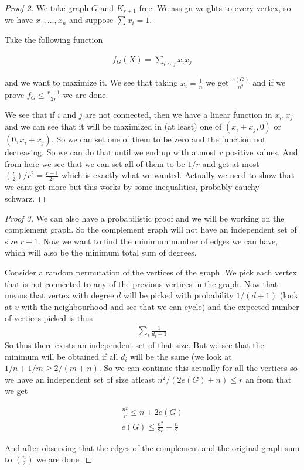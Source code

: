 \begin{proof}[Proof 2]
    We take graph $G$ and $K_{r+1}$ free. We assign weights to every vertex, so we have $x_1, \ldots, x_n$ and suppose $\sum x_i = 1$.

    Take the following function

    \begin{align}
        f_G (X) = \sum _{i \sim j} x_i x_j
    \end{align}

    and we want to maximize it. We see that taking $x_i = \frac 1 n$ we get $\frac{e(G)}{n^2}$ and if we prove $f_G \leq \frac{r-1}{2r}$ we are done.

    We see that if $i$ and $j$ are not connected, then we have a linear function in $x_i, x_j$ and we can see that it will be maximized in (at least) one of $(x_i+x_j, 0)$ or $(0, x_i + x_j)$. So we can set one of them to be zero and the function not decreasing. So we can do that until we end up with atmost $r$ positive values. And from here we see that we can set all of them to be $1/r$ and get at most $\binom{r}{2}/r^2 = \frac{r-1}{2r}$ which is exactly what we wanted. Actually we need to show that we cant get more but this works by some inequalities, probably cauchy schwarz.
\end{proof}

\begin{proof}[Proof 3]
    We can also have a probabilistic proof and we will be working on the complement graph. So the complement graph will not have an independent set of size $r+1$. Now we want to find the minimum number of edges we can have, which will also be the minimum total sum of degrees.

    Consider a random permutation of the vertices of the graph. We pick each vertex that is not connected to any of the previous vertices in the graph. Now that means that vertex with degree $d$ will be picked with probability $1/(d+1)$ (look at $v$ with the neighbourhood and see that we can cycle) and the expected number of vertices picked is thus 
    \begin{align*}
        \sum_i \frac{1}{d_i +1}
    \end{align*}
    So thus there exists an independent set of that size. But we see that the minimum will be obtained if all $d_i$ will be the same (we look at $1/n + 1/m \geq 2/(m+n)$. So we can continue this actually for all the vertices so we have an independent set of size atleast $n^2/(2e(G)+n)\leq r$ an from that we get

    \begin{align}
        \frac{n^2}{r} \leq n + 2e(G) \\
        e(G) \leq \frac{n^2}{2r} - \frac{n}{2}
    \end{align}

    And after observing that the edges of the complement and the original graph sum to $\binom n 2$ we are done.
\end{proof}

